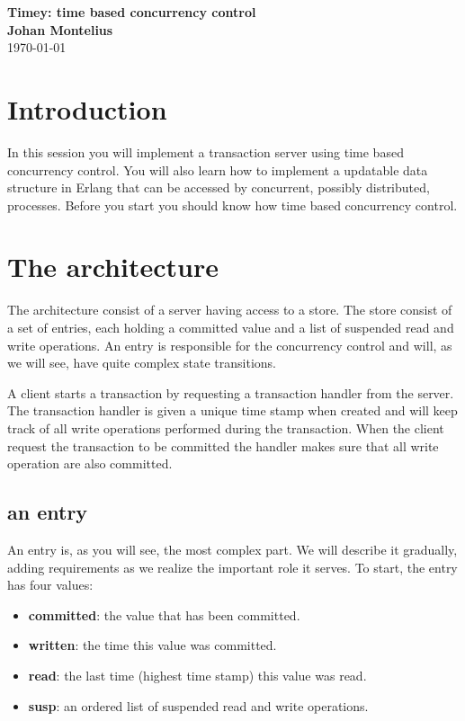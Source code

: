 \documentclass[a4paper, 11pt]{article}
\newcommand{\nnsection}[1]{
\section*{#1}
\addcontentsline{toc}{section}{#1}
}
\begin{document}
\begin{center}
\vspace{20pt}
\textbf{\large Timey: time based concurrency control}\\
\vspace{10pt}
\textbf{Johan Montelius}\\
\vspace{10pt}
\today{}
\end{center}

\nnsection{Introduction}

In this session you will implement a transaction server using
time based concurrency control. You will also learn how to implement a
updatable data structure in Erlang that can be accessed by concurrent,
possibly distributed, processes. Before you start you should know how
time based concurrency control.

\section{The architecture}

The architecture consist of a server having access to a store. The
store consist of a set of entries, each holding a committed value and a
list of suspended read and write operations. An entry is responsible
for the concurrency control and will, as we will see, have quite complex
state transitions. 

A client starts a transaction by requesting a transaction handler from
the server. The transaction handler is given a unique time stamp when
created and will keep track of all write operations performed during
the transaction. When the client request the transaction to be committed
the handler makes sure that all write operation are also committed.

\subsection{an entry}

An entry is, as you will see, the most complex part. We will describe
it gradually, adding requirements as we realize the important role it
serves. To start, the entry has four values:

\begin{itemize}
\item {\bf committed}: the value that has been committed.
\item {\bf written}: the time this value was committed.
\item {\bf read}: the last time (highest time stamp) this value was read.
\item {\bf susp}: an ordered list of suspended read and write operations.
\end{itemize}
\end{document}
